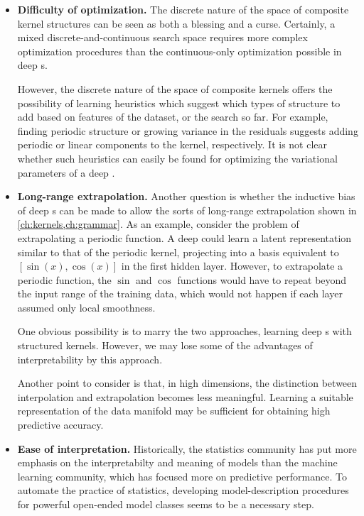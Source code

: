 \begin{itemize}

\item {\bf Difficulty of optimization.}
The discrete nature of the space of composite kernel structures can be seen as both a blessing and a curse.
Certainly, a mixed discrete-and-continuous search space requires more complex optimization procedures than the continuous-only optimization possible in deep \gp{}s.

However, the discrete nature of the space of composite kernels offers the possibility of learning heuristics which suggest which types of structure to add based on features of the dataset, or the search so far.
For example, finding periodic structure or growing variance in the residuals suggests adding periodic or linear components to the kernel, respectively.
It is not clear whether such heuristics can easily be found for optimizing the variational parameters of a deep \gp{}.

\item {\bf Long-range extrapolation.}
Another question is whether the inductive bias of deep \gp{}s can be made to allow the sorts of long-range extrapolation shown in \cref{ch:kernels,ch:grammar}.
As an example, consider the problem of extrapolating a periodic function.
A deep \gp{} could learn a latent representation similar to that of the periodic kernel, projecting into a basis equivalent to $[\sin(x), \cos(x)]$ in the first hidden layer.
However, to extrapolate a periodic function, the $\sin$ and $\cos$ functions would have to repeat beyond the input range of the training data, which would not happen if each layer assumed only local smoothness.

One obvious possibility is to marry the two approaches, learning deep \gp{}s with structured kernels.
However, we may lose some of the advantages of interpretability by this approach.

Another point to consider is that, in high dimensions, the distinction between interpolation and extrapolation becomes less meaningful.
Learning a suitable representation of the data manifold may be sufficient for obtaining high predictive accuracy.

\item {\bf Ease of interpretation.}
Historically, the statistics community has put more emphasis on the interpretabilty and meaning of models than the machine learning community, which has focused more on predictive performance.
To automate the practice of statistics, developing model-description procedures for powerful open-ended model classes seems to be a necessary step. %


\end{itemize}
